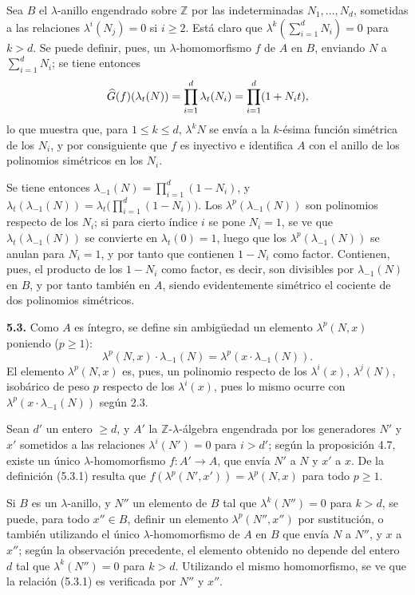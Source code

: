 Sea \(B\) el \(\lambda\)-anillo engendrado sobre \(\mathbb Z\) por las indeterminadas \(N_1,\ldots,N_d\), sometidas a las relaciones \(\lambda^i(N_j)=0\) si \(i\ge2\). Está claro que \(\lambda^k(\sum_{i=1}^{d}N_i)=0\) para \(k>d\). Se puede definir, pues, un \(\lambda\)-homomorfismo \(f\) de \(A\) en \(B\), enviando \(N\) a \(\sum_{i=1}^{d}N_i\); se tiene entonces
\[
  \widehat G(f)(\lambda_t(N))=\prod_{i=1}^{d}\lambda_t(N_i)=\prod_{i=1}^{d}(1+N_it),
\]
lo que muestra que, para \(1\le k\le d\), \(\lambda^k N\) se envía a la \(k\)-ésima función simétrica de los \(N_i\), y por consiguiente que \(f\) es inyectivo e identifica \(A\) con el anillo de los polinomios simétricos en los \(N_i\).

Se tiene entonces \(\lambda_{-1}(N)=\prod_{i=1}^{d}(1-N_i)\), y \(\lambda_t(\lambda_{-1}(N))=\lambda_t\bigl(\prod_{i=1}^{d}(1-N_i)\bigr)\). Los \(\lambda^p(\lambda_{-1}(N))\) son polinomios respecto de los \(N_i\); si para cierto índice \(i\) se pone \(N_i=1\), se ve que \(\lambda_t(\lambda_{-1}(N))\) se convierte en \(\lambda_t(0)=1\), luego que los \(\lambda^p(\lambda_{-1}(N))\) se anulan para \(N_i=1\), y por tanto que contienen \(1-N_i\) como factor. Contienen, pues, el producto de los \(1-N_i\) como factor, es decir, son divisibles por \(\lambda_{-1}(N)\) en \(B\), y por tanto también en \(A\), siendo evidentemente simétrico el cociente de dos polinomios simétricos.

\textbf{5.3.} Como \(A\) es íntegro, se define sin ambigüedad un elemento \(\lambda^p(N,x)\) poniendo (\(p\ge1\)):
\begin{equation}\tag{5.3.1}
  \lambda^p(N,x)\cdot\lambda_{-1}(N)=\lambda^p(x\cdot\lambda_{-1}(N)).
\end{equation}
El elemento \(\lambda^p(N,x)\) es, pues, un polinomio respecto de los \(\lambda^i(x)\), \(\lambda^j(N)\), isobárico de peso \(p\) respecto de los \(\lambda^i(x)\), pues lo mismo ocurre con \(\lambda^p(x\cdot\lambda_{-1}(N))\) según 2.3.

Sean \(d'\) un entero \(\ge d\), y \(A'\) la \(\mathbb Z\)-\(\lambda\)-álgebra engendrada por los generadores \(N'\) y \(x'\) sometidos a las relaciones \(\lambda^i(N')=0\) para \(i>d'\); según la proposición 4.7, existe un único \(\lambda\)-homomorfismo \(f:A'\longrightarrow A\), que envía \(N'\) a \(N\) y \(x'\) a \(x\). De la definición (5.3.1) resulta que \(f(\lambda^p(N',x'))=\lambda^p(N,x)\) para todo \(p\ge1\).

Si \(B\) es un \(\lambda\)-anillo, y \(N''\) un elemento de \(B\) tal que \(\lambda^k(N'')=0\) para \(k>d\), se puede, para todo \(x''\in B\), definir un elemento \(\lambda^p(N'',x'')\) por sustitución, o también utilizando el único \(\lambda\)-homomorfismo de \(A\) en \(B\) que envía \(N\) a \(N''\), y \(x\) a \(x''\); según la observación precedente, el elemento obtenido no depende del entero \(d\) tal que \(\lambda^k(N'')=0\) para \(k>d\). Utilizando el mismo homomorfismo, se ve que la relación (5.3.1) es verificada por \(N''\) y \(x''\).

